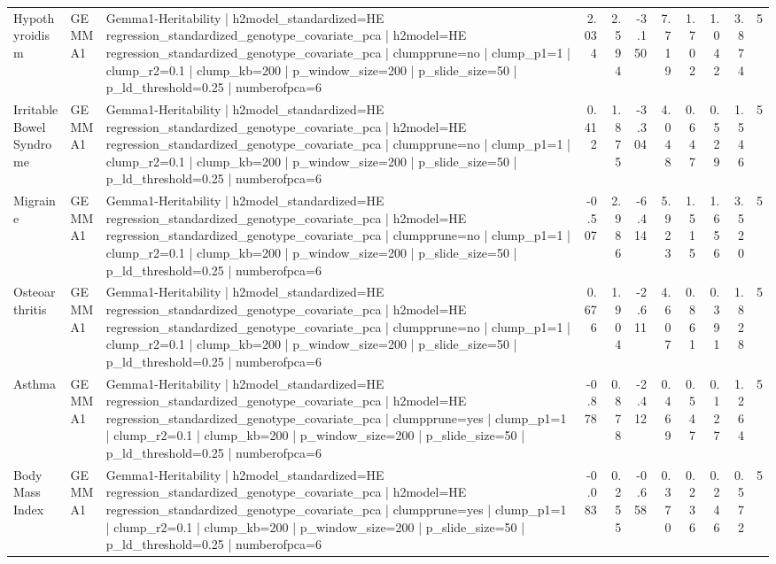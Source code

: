 \begin{landscape}
\begin{longtable}{p{2.4cm}p{1.8cm}p{6.0cm}rrrrrrrr}
Hypothyroidism & GEMMA1 & Gemma1-Heritability | h2model\_standardized=HE regression\_standardized\_genotype\_covariate\_pca | h2model=HE regression\_standardized\_genotype\_covariate\_pca | clumpprune=no | clump\_p1=1 | clump\_r2=0.1 | clump\_kb=200 | p\_window\_size=200 | p\_slide\_size=50 | p\_ld\_threshold=0.25 | numberofpca=6 & 2.034 & 2.594 & -3.150 & 7.719 & 1.702 & 1.042 & 3.874 & 5 \\
Irritable Bowel Syndrome & GEMMA1 & Gemma1-Heritability | h2model\_standardized=HE regression\_standardized\_genotype\_covariate\_pca | h2model=HE regression\_standardized\_genotype\_covariate\_pca | clumpprune=no | clump\_p1=1 | clump\_r2=0.1 | clump\_kb=200 | p\_window\_size=200 | p\_slide\_size=50 | p\_ld\_threshold=0.25 | numberofpca=6 & 0.412 & 1.875 & -3.304 & 4.048 & 0.647 & 0.529 & 1.546 & 5 \\
Migraine & GEMMA1 & Gemma1-Heritability | h2model\_standardized=HE regression\_standardized\_genotype\_covariate\_pca | h2model=HE regression\_standardized\_genotype\_covariate\_pca | clumpprune=no | clump\_p1=1 | clump\_r2=0.1 | clump\_kb=200 | p\_window\_size=200 | p\_slide\_size=50 | p\_ld\_threshold=0.25 | numberofpca=6 & -0.507 & 2.986 & -6.414 & 5.923 & 1.515 & 1.656 & 3.520 & 5 \\
Osteoarthritis & GEMMA1 & Gemma1-Heritability | h2model\_standardized=HE regression\_standardized\_genotype\_covariate\_pca | h2model=HE regression\_standardized\_genotype\_covariate\_pca | clumpprune=no | clump\_p1=1 | clump\_r2=0.1 | clump\_kb=200 | p\_window\_size=200 | p\_slide\_size=50 | p\_ld\_threshold=0.25 | numberofpca=6 & 0.676 & 1.904 & -2.611 & 4.607 & 0.861 & 0.391 & 1.828 & 5 \\
Asthma & GEMMA1 & Gemma1-Heritability | h2model\_standardized=HE regression\_standardized\_genotype\_covariate\_pca | h2model=HE regression\_standardized\_genotype\_covariate\_pca | clumpprune=yes | clump\_p1=1 | clump\_r2=0.1 | clump\_kb=200 | p\_window\_size=200 | p\_slide\_size=50 | p\_ld\_threshold=0.25 | numberofpca=6 & -0.878 & 0.878 & -2.412 & 0.469 & 0.547 & 0.127 & 1.264 & 5 \\
Body Mass Index & GEMMA1 & Gemma1-Heritability | h2model\_standardized=HE regression\_standardized\_genotype\_covariate\_pca | h2model=HE regression\_standardized\_genotype\_covariate\_pca | clumpprune=yes | clump\_p1=1 | clump\_r2=0.1 | clump\_kb=200 | p\_window\_size=200 | p\_slide\_size=50 | p\_ld\_threshold=0.25 | numberofpca=6 & -0.083 & 0.255 & -0.658 & 0.370 & 0.236 & 0.246 & 0.572 & 5 \\

\end{longtable}
\end{landscape}
